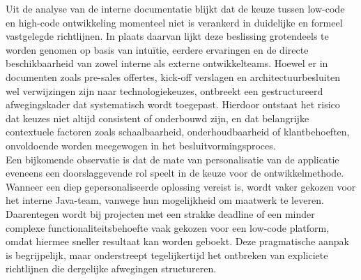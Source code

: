 Uit de analyse van de interne documentatie blijkt dat de keuze tussen low-code en high-code ontwikkeling momenteel niet is verankerd in duidelijke en formeel vastgelegde richtlijnen. In plaats daarvan lijkt deze beslissing grotendeels te worden genomen op basis van intuïtie, eerdere ervaringen en de directe beschikbaarheid van zowel interne als externe ontwikkelteams. Hoewel er in documenten zoals pre-sales offertes, kick-off verslagen en architectuurbesluiten wel verwijzingen zijn naar technologiekeuzes, ontbreekt een gestructureerd afwegingskader dat systematisch wordt toegepast. Hierdoor ontstaat het risico dat keuzes niet altijd consistent of onderbouwd zijn, en dat belangrijke contextuele factoren zoals schaalbaarheid, onderhoudbaarheid of klantbehoeften, onvoldoende worden meegewogen in het besluitvormingsproces.
\\
Een bijkomende observatie is dat de mate van personalisatie van de applicatie eveneens een doorslaggevende rol speelt in de keuze voor de ontwikkelmethode. Wanneer een diep gepersonaliseerde oplossing vereist is, wordt vaker gekozen voor het interne Java-team, vanwege hun mogelijkheid om maatwerk te leveren. Daarentegen wordt bij projecten met een strakke deadline of een minder complexe functionaliteitsbehoefte vaak gekozen voor een low-code platform, omdat hiermee sneller resultaat kan worden geboekt. Deze pragmatische aanpak is begrijpelijk, maar onderstreept tegelijkertijd het ontbreken van expliciete richtlijnen die dergelijke afwegingen structureren.







